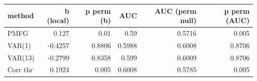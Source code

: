 \begin{tabular}{lrrrrr}
\toprule
method & b (local) & p perm (b) & AUC & AUC (perm null) & p perm (AUC) \\
\midrule
PMFG & 0.127 & 0.01 & 0.59 & 0.5716 & 0.005 \\
VAR(1) & -0.4257 & 0.8806 & 0.5988 & 0.6008 & 0.8706 \\
VAR(13) & -0.2799 & 0.8358 & 0.599 & 0.6009 & 0.8706 \\
Corr thr & 0.1924 & 0.005 & 0.6008 & 0.5785 & 0.005 \\
\bottomrule
\end{tabular}
